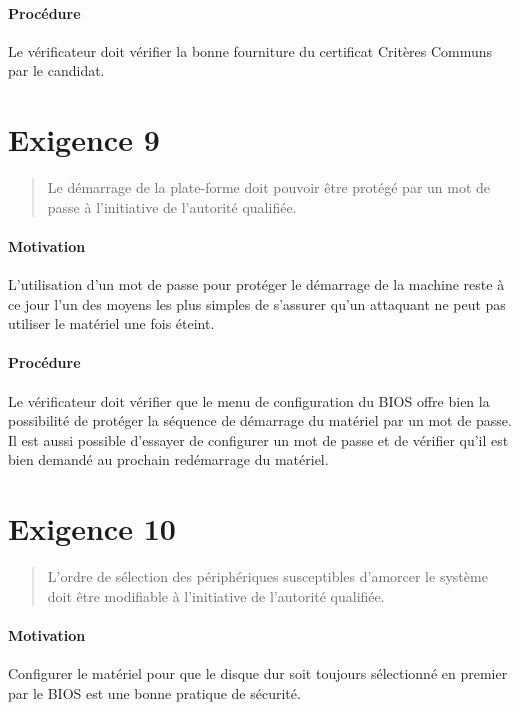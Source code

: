 \documentclass{report}
\begin{document}
\paragraph{Procédure}
%
Le vérificateur doit vérifier la bonne fourniture du certificat Critères Communs
par le candidat.

\section{Exigence 9}

\begin{quote}
  Le démarrage de la plate-forme doit pouvoir être protégé par un mot de passe à
  l’initiative de l’autorité qualifiée.
\end{quote}

\paragraph{Motivation}
%
L’utilisation d’un mot de passe pour protéger le démarrage de la machine reste à
ce jour l’un des moyens les plus simples de s’assurer qu’un attaquant ne peut
pas utiliser le matériel une fois éteint.

\paragraph{Procédure}
%
Le vérificateur doit vérifier que le menu de configuration du BIOS offre bien la
possibilité de protéger la séquence de démarrage du matériel par un mot de
passe.
%
Il est aussi possible d’essayer de configurer un mot de passe et de vérifier
qu’il est bien demandé au prochain redémarrage du matériel.

\section{Exigence 10}

\begin{quote}
  L’ordre de sélection des périphériques susceptibles d’amorcer le système doit
  être modifiable à l’initiative de l’autorité qualifiée.
\end{quote}

\paragraph{Motivation}
%
Configurer le matériel pour que le disque dur soit toujours sélectionné en
premier par le BIOS est une bonne pratique de sécurité.
\end{document}
